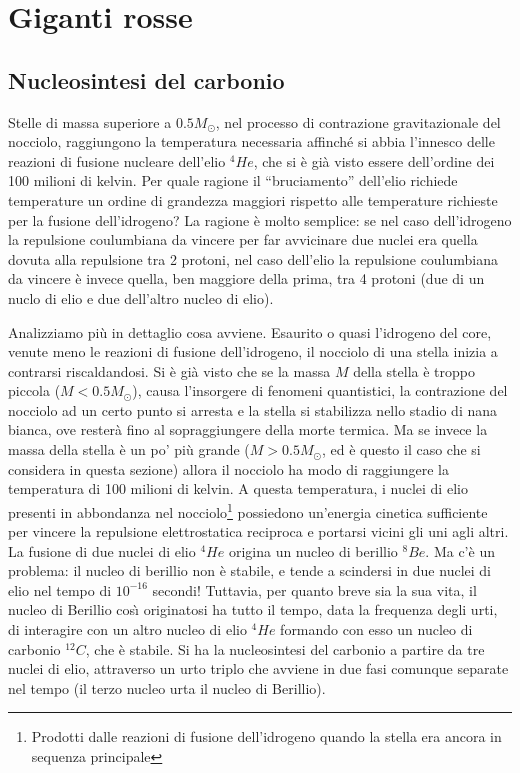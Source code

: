 \section{Giganti rosse}\label{giganti rosse}
\subsection{Nucleosintesi del carbonio}
Stelle di massa superiore a $0.5M_{\odot}$, nel processo di contrazione gravitazionale del nocciolo, raggiungono la temperatura necessaria affinché si abbia l'innesco delle reazioni di fusione nucleare dell'elio $^{4}He$, che si è gi\`{a} visto essere dell'ordine dei 100 milioni di kelvin.
Per quale ragione il ``bruciamento'' dell'elio richiede temperature un ordine di grandezza maggiori rispetto alle temperature richieste per la fusione dell'idrogeno? La ragione è molto semplice: se nel caso dell'idrogeno la repulsione coulumbiana da vincere per far avvicinare due nuclei era quella dovuta alla repulsione tra 2 protoni, nel caso dell'elio la repulsione coulumbiana da vincere è invece quella, ben maggiore della prima, tra 4 protoni (due di un nuclo di elio e due dell'altro nucleo di elio).
\par
Analizziamo più in dettaglio cosa avviene. Esaurito o quasi l'idrogeno del core, venute meno le reazioni di fusione dell'idrogeno, il nocciolo di una stella inizia a contrarsi riscaldandosi. Si è gi\`{a} visto che se la massa $M$ della stella è troppo piccola ($M<0.5 M_{\odot}$), causa l'insorgere di fenomeni quantistici, la contrazione del nocciolo ad un certo punto si arresta e la stella si stabilizza nello stadio di nana bianca, ove rester\`{a} fino al sopraggiungere della morte termica. Ma se invece la massa della stella è un po' più grande ($M>0.5M_{\odot}$, ed è questo il caso che si considera in questa sezione) allora il nocciolo ha modo di raggiungere la temperatura di 100 milioni di kelvin. A questa temperatura, i nuclei di elio presenti in abbondanza nel nocciolo\footnote{Prodotti dalle reazioni di fusione dell'idrogeno quando la stella era ancora in sequenza principale} possiedono un'energia cinetica sufficiente per vincere la repulsione elettrostatica reciproca e portarsi vicini gli uni agli altri. La fusione di due nuclei di elio $^{4}He$ origina un nucleo di berillio $^{8}Be$. Ma c'è un problema: il nucleo di berillio non è stabile, e tende a scindersi in due nuclei di elio nel tempo di $10^{-16}$ secondi! Tuttavia, per quanto breve sia la sua vita, il nucleo di Berillio cos\`{\i}{} originatosi ha tutto il tempo, data la frequenza degli urti, di interagire con un altro nucleo di elio $^{4}He$ formando con esso un nucleo di carbonio $^{12}C$, che è stabile. Si ha la nucleosintesi del carbonio a partire da tre nuclei di elio, attraverso un urto triplo che avviene in due fasi comunque separate nel tempo (il terzo nucleo urta il nucleo di Berillio).
